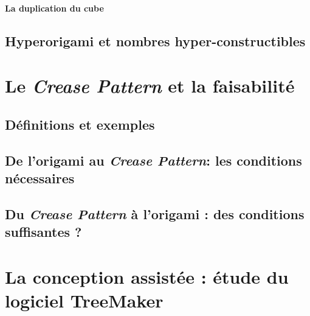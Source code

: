 \documentclass[a4paper,12pt,french,draft]{report}
\begin{document}
		\subsubsection{La duplication du cube}
	
	\section{Hyperorigami et nombres hyper-constructibles}
	

\chapter{Le \emph{Crease Pattern} et la faisabilité}
	\section{Définitions et exemples}
	\section{De l'origami au \emph{Crease Pattern}: les conditions nécessaires}
	\section{Du \emph{Crease Pattern} à l'origami : des conditions suffisantes ?}

\chapter{La conception assistée : étude du logiciel TreeMaker}
\end{document}
